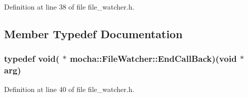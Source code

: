 Definition at line 38 of file file\_\-watcher.h.



\subsection{Member Typedef Documentation}
\hypertarget{classmocha_1_1_file_watcher_af774b8dd436b9f8929506466533831b9}{
\subsubsection[{EndCallBack}]{\setlength{\rightskip}{0pt plus 5cm}typedef void( $\ast$ {\bf mocha::FileWatcher::EndCallBack})(void $\ast$arg)}}
\label{classmocha_1_1_file_watcher_af774b8dd436b9f8929506466533831b9}


Definition at line 40 of file file\_\-watcher.h.



